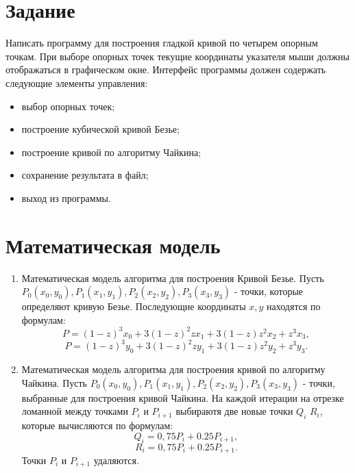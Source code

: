 \documentclass[14pt, a4paper]{extreport}
\begin{document}
\author{Исрафилова~Д.В.}
\maketitle

\chapter{Задание}

    \par
    Написать программу для построения гладкой кривой по четырем опорным точкам. При выборе опорных точек текущие координаты указателя мыши должны отображаться в графическом окне. Интерфейс программы должен содержать следующие элементы управления:
    \begin{itemize}
		\item выбор опорных точек;
		\item построение кубической кривой Безье;
		\item построение кривой по алгоритму Чайкина;
        \item сохранение результата в файл;
        \item выход из программы.
	\end{itemize}
	



\chapter{Математическая модель}
\begin{enumerate}
    \item Математическая модель алгоритма для построения Кривой Безье.
Пусть $P_0(x_0,y_0), P_1(x_1,y_1), P_2(x_2,y_2), P_3(x_3,y_3)$ - точки, которые определяют кривую Безье. 
Последующие координаты $x,y$ находятся по формулам:
$$P = (1 - z)^3x_0 + 3(1 - z)^2zx_1 + 3(1 - z)z^2x_2 + z^3x_3,$$
$$P = (1 - z)^3y_0 + 3(1 - z)^2zy_1 + 3(1 - z)z^2y_2 + z^3y_3.$$
    \item Математическая модель алгоритма для построения кривой по алгоритму Чайкина.
Пусть $P_0(x_0,y_0), P_1(x_1,y_1), P_2(x_2,y_2), P_3(x_3,y_3)$ - точки, выбранные для 
построения кривой Чайкина.
На каждой итерации на отрезке ломанной между точками $P_i$ и $P_{i+1}$ выбираютя две новые точки $Q_i$ $R_i$, которые вычисляются по формулам:
$$Q_i = 0,75P_i + 0.25P_{i+1},$$
$$R_i = 0,75P_i + 0.25P_{i+1}.$$
Точки $P_i$ и $P_{i+1}$ удаляются.
\end{enumerate}
\end{document}
